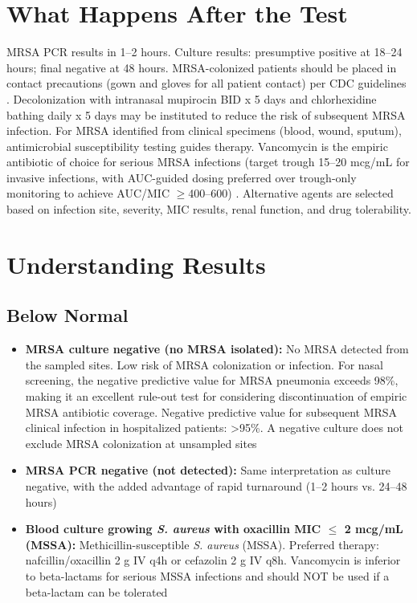 \section*{What Happens After the Test}
MRSA PCR results in 1--2 hours. Culture results: presumptive positive at 18--24 hours; final negative at 48 hours. MRSA-colonized patients should be placed in contact precautions (gown and gloves for all patient contact) per CDC guidelines \cite{calfee2014strategies}. Decolonization with intranasal mupirocin BID x 5 days and chlorhexidine bathing daily x 5 days may be instituted to reduce the risk of subsequent MRSA infection. For MRSA identified from clinical specimens (blood, wound, sputum), antimicrobial susceptibility testing guides therapy. Vancomycin is the empiric antibiotic of choice for serious MRSA infections (target trough 15--20 mcg/mL for invasive infections, with AUC-guided dosing preferred over trough-only monitoring to achieve AUC/MIC $\geq$400--600) \cite{liu2011clinical}. Alternative agents are selected based on infection site, severity, MIC results, renal function, and drug tolerability.

\section*{Understanding Results}

\subsection*{Below Normal}
\begin{itemize}
  \item \textbf{MRSA culture negative (no MRSA isolated):} No MRSA detected from the sampled sites. Low risk of MRSA colonization or infection. For nasal screening, the negative predictive value for MRSA pneumonia exceeds 98\%, making it an excellent rule-out test for considering discontinuation of empiric MRSA antibiotic coverage. Negative predictive value for subsequent MRSA clinical infection in hospitalized patients: >95\%. A negative culture does not exclude MRSA colonization at unsampled sites
  \item \textbf{MRSA PCR negative (not detected):} Same interpretation as culture negative, with the added advantage of rapid turnaround (1--2 hours vs. 24--48 hours)
  \item \textbf{Blood culture growing \textit{S. aureus} with oxacillin MIC $\leq$ 2 mcg/mL (MSSA):} Methicillin-susceptible \textit{S. aureus} (MSSA). Preferred therapy: nafcillin/oxacillin 2 g IV q4h or cefazolin 2 g IV q8h. Vancomycin is inferior to beta-lactams for serious MSSA infections and should NOT be used if a beta-lactam can be tolerated
\end{itemize}

